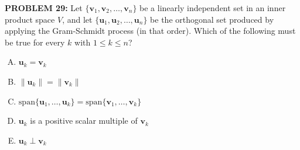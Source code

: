 \documentclass[12pt]{amsart}
\newcommand{\norm}[1]{\|#1\|}
\begin{document}
{\bf PROBLEM 29:}
%
Let $\{\mathbf{v}_1, \mathbf{v}_2, \ldots, \mathbf{v}_n\}$ be a linearly
independent set in an inner product space $V$, and let $\{\mathbf{u}_1,
\mathbf{u}_2, \ldots, \mathbf{u}_n\}$ be the orthogonal set produced by
applying the Gram-Schmidt process (in that order).  Which of the
following must be true for every $k$ with $1 \leq k \leq n$?
%
\begin{enumerate}[(A)]
\item $\mathbf{u}_k = \mathbf{v}_k$
\item $\norm{\mathbf{u}_k} = \norm{\mathbf{v}_k}$
\item $\mathrm{span}\{\mathbf{u}_1, \ldots, \mathbf{u}_k\} = \mathrm{span}\{\mathbf{v}_1, \ldots, \mathbf{v}_k\}$
\item $\mathbf{u}_k$ is a positive scalar multiple of $\mathbf{v}_k$
\item $\mathbf{u}_k \perp \mathbf{v}_k$
\end{enumerate}
%
%
%
%
\end{document}
